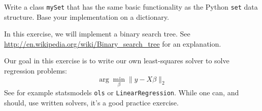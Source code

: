 \begin{questions}
    Write a class \texttt{mySet} that has the same basic functionality as
    the Python \texttt{set} data structure.
    Base your implementation on a dictionary.

    \label{sub:binary_search_tree}

        In this exercise, we will implement a binary search tree.
        See \url{http://en.wikipedia.org/wiki/Binary_search_tree} for
        an explanation.



    \label{sub:binary_search_tree}

        Our goal in this exercise is to write our own least-squares solver to solve regression problems:
        \[
            \arg\min_{\beta} \|y - X\beta\|_2
        \]
        See for example statsmodels \texttt{ols} or \texttt{LinearRegression}.
        While one can, and should, use written solvers, it's a good practice exercise.

        \begin{parts}

\end{parts}
\end{questions}
